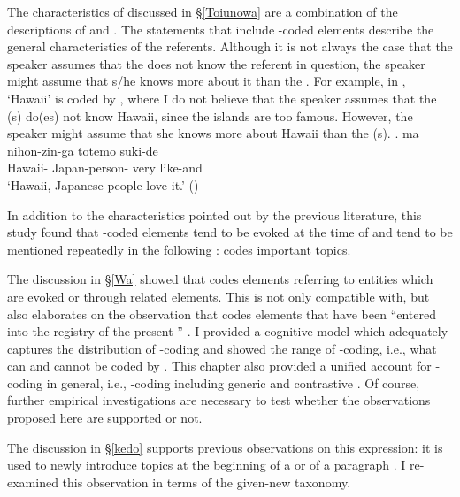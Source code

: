 The characteristics of 
discussed in \S \ref{Toiunowa}
are a combination of
the descriptions of  and .
The statements that include -coded elements describe the general characteristics of the referents.
Although it is not always the case that the speaker assumes that the  does not know the referent in question,
the speaker might assume that s/he knows more about it than the .
For example, in \Next,
 `Hawaii' is coded by ,
where I do not believe that
the speaker assumes that the (s) do(es) not know Hawaii, since the islands are too famous.
However, the speaker might assume that she knows more about Hawaii than the (s).
%
\exg.  ma nihon-zin-ga totemo suki-de \\
	Hawaii-  Japan-person- very like-and \\
	`Hawaii, Japanese people love it.'
	\hfill{()}

In addition to the characteristics pointed out by the previous literature,
this study found that -coded elements tend to be evoked at the time of 
and tend to be mentioned repeatedly in the following :
 codes important topics.

The discussion in \S \ref{Wa} showed that
 codes elements referring to entities which are
evoked or  through related elements.
This is not only compatible with, but also elaborates on the observation that
 codes elements that have been ``entered into the registry of the present '' \cite[45]{kuno73}.
I provided a cognitive model which adequately captures the distribution of -coding and showed the range of -coding, i.e., 
what can and cannot be coded by .
This chapter also provided a unified account for -coding in general,
i.e., -coding including generic and contrastive .
Of course, further empirical investigations are necessary to test whether the observations proposed here are supported or not.

The discussion in \S \ref{kedo} supports previous observations on this  expression:
it is used to newly introduce topics at the beginning of a  or of a paragraph \cite{koide84,takahashi99}.
I re-examined this observation in terms of the given-new taxonomy.

